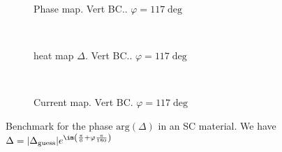 \documentclass[../main.tex]{subfiles}
\begin{document}
\begin{figure}[H]
\begin{subfigure}{0.4\textwidth}
    \centering
    \hspace{-4cm} %
    
    \caption{Phase map. Vert BC.. $\varphi = 117\deg$}
    \label{fig:first}
\end{subfigure}    \\
\begin{subfigure}{0.4\textwidth}
    \centering
    \hspace{-4cm} %
    
    \caption{heat map $\Delta$. Vert BC.. $\varphi = 117\deg$}
    \label{fig:first}
\end{subfigure}    \\
\hspace{0.1\textwidth}
\begin{subfigure}{0.4\textwidth}
    \centering
    
    \caption{Current map. Vert BC. $\varphi = 117 \deg$}
    \label{fig:first}
\end{subfigure}

\caption{Benchmark for the phase $\text{arg}(\Delta)$ in an SC material. We have $\Delta = |\Delta_{\text{guess}}|e^{\im \left(\frac{\pi}{6} + \varphi\frac{\pi}{180}\right)}$}
\end{figure}
\end{document}
